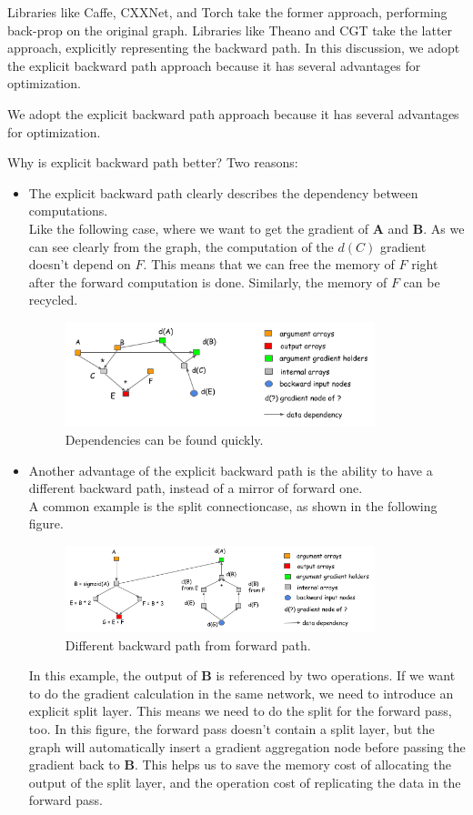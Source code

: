Libraries like Caffe, CXXNet, and Torch take the former approach, performing back-prop on the original graph. Libraries like Theano and CGT take the latter approach, explicitly representing the backward path. In this discussion, we adopt the explicit backward path approach because it has several advantages for optimization.

We adopt the explicit backward path approach because it has several advantages for optimization.

Why is explicit backward path better? Two reasons:
\begin{itemize}
\item The explicit backward path clearly describes the dependency between computations.\\
Like the following case, where we want to get the gradient of \textbf{A} and \textbf{B}. As we can see clearly from the graph, the computation of the $d(C)$ gradient doesn’t depend on $F$. This means that we can free the memory of $F$ right after the forward computation is done. Similarly, the memory of $F$ can be recycled.
\begin{figure}[!hbtp]
\centering
\includegraphics[width=0.85\textwidth]{MXNet/back_dep_prune}
\caption{Dependencies can be found quickly.}
\end{figure}

\item Another advantage of the explicit backward path is the ability to have a different backward path, instead of a mirror of forward one.\\
A common example is the split connectioncase, as shown in the following figure.
\begin{figure}[!hbtp]
\centering
\includegraphics[width=0.85\textwidth]{MXNet/back_agg_grad}
\caption{Different backward path from forward path.}
\end{figure}
In this example, the output of \textbf{B} is referenced by two operations. If we want to do the gradient calculation in the same network, we need to introduce an explicit split layer. This means we need to do the split for the forward pass, too. In this figure, the forward pass doesn’t contain a split layer, but the graph will automatically insert a gradient aggregation node before passing the gradient back to \textbf{B}. This helps us to save the memory cost of allocating the output of the split layer, and the operation cost of replicating the data in the forward pass.
\end{itemize}


